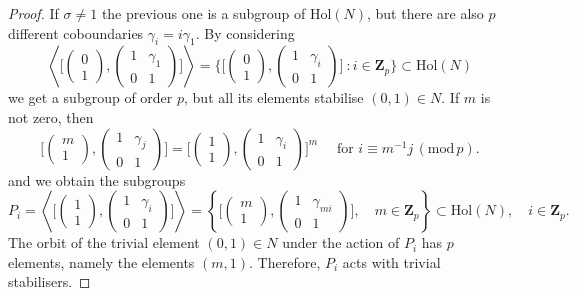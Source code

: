 \documentclass[12pt]{article}
\theoremstyle{definition}
\newcommand{\Z}{\mathbf Z}
\newcommand{\Hol}{\mathrm{Hol}}
\begin{document}
\begin{proof}
If $\sigma\ne 1$  the
		previous one is a subgroup of $\Hol(N)$, but there are also $p$ different coboundaries $\gamma_i=i\gamma_1$. 
		By considering 
		$$
		\left\langle \Big[\begin{pmatrix}
		0\\
		1
		\end{pmatrix},\begin{pmatrix}
		1 & \gamma_1\\
		0&1
		\end{pmatrix}\Big] \right\rangle=
		\Big\{\Big[\begin{pmatrix}
		0\\
		1
		\end{pmatrix},\begin{pmatrix}
		1 & \gamma_i\\
		0&1
		\end{pmatrix}\Big]\ \colon i\in\Z_p
		\Big\}\subset \Hol(N)
		$$
		we get a subgroup of order $p$, but all its elements stabilise $(0,1)\in N$. If $m$ is not zero, then $$
		\Big[\begin{pmatrix}
		m\\
		1
		\end{pmatrix},\begin{pmatrix}
		1 & \gamma_j\\
		0&1
		\end{pmatrix}\Big]=[\begin{pmatrix}
		1\\
		1
		\end{pmatrix},\begin{pmatrix}
		1 & \gamma_i\\
		0&1
		\end{pmatrix}\Big]^m \quad \mbox{ for }
		i\equiv m^{-1}j\,(\mathrm{mod}\,p).$$
and we obtain the subgroups 
		$$
		P_i=\left\langle \Big[\begin{pmatrix}
		1\\
		1
		\end{pmatrix},\begin{pmatrix}
		1 & \gamma_i\\
		0&1
		\end{pmatrix}\Big] \right\rangle
  =\left\{
  \Big[\begin{pmatrix}
		m\\
		1
		\end{pmatrix},\begin{pmatrix}
		1 & \gamma_{mi}\\
		0&1
		\end{pmatrix}\Big],\quad m\in \Z_p 
  \right\}
  \subset \Hol(N),\quad i\in\Z_p.
		$$
		The orbit of the trivial element $(0,1)\in N$ under the action of $P_i$ has $p$ elements, namely the elements $(m,1)$. Therefore, $P_i$ acts with trivial stabilisers.
\end{proof}
\end{document}
